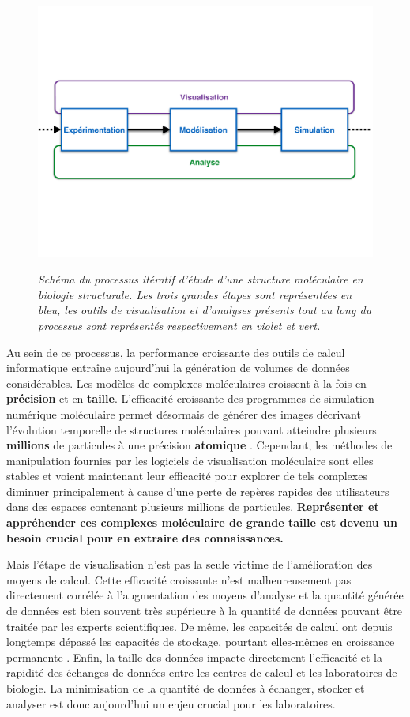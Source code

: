 \begin{figure}[h]
  \centering
  {\includegraphics[width=.75\linewidth]{./figures/ch1/process_bio_struct}}
    \caption{{\it Schéma du processus itératif d'étude d'une structure moléculaire en biologie structurale. Les trois grandes étapes sont représentées en bleu, les outils de visualisation et d'analyses présents tout au long du processus sont représentés respectivement en violet et vert.}}
  \label{Fig:process_bio_struct}
  \hspace{0.2cm}
\end{figure}

Au sein de ce processus, la performance croissante des outils de calcul informatique entraîne aujourd'hui la génération de volumes de données considérables. Les modèles de complexes moléculaires croissent à la fois en \textbf{précision} et en \textbf{taille}. L'efficacité croissante des programmes de simulation numérique moléculaire permet désormais de générer des images décrivant l'évolution temporelle de structures moléculaires pouvant atteindre plusieurs \textbf{millions} de particules à une précision \textbf{atomique} \cite{sanbonmatsu2013molecular}. Cependant, les méthodes de manipulation fournies par les logiciels de visualisation moléculaire sont elles stables et voient maintenant leur efficacité pour explorer de tels complexes diminuer principalement à cause d'une perte de repères rapides des utilisateurs dans des espaces contenant plusieurs millions de particules.
\textbf{Représenter et appréhender ces complexes moléculaire de grande taille est devenu un besoin crucial pour en extraire des connaissances.} 

Mais l'étape de visualisation n'est pas la seule victime de l'amélioration des moyens de calcul. Cette efficacité croissante n'est malheureusement pas directement corrélée à l'augmentation des moyens d'analyse et la quantité générée de données est bien souvent très supérieure à la quantité de données pouvant être traitée par les experts scientifiques. De même, les capacités de calcul ont depuis longtemps dépassé les capacités de stockage, pourtant elles-mêmes en croissance permanente \cite{zimmerman2014data}. Enfin, la taille des données impacte directement l'efficacité et la rapidité des échanges de données entre les centres de calcul et les laboratoires de biologie. La minimisation de la quantité de données à échanger, stocker et analyser est donc aujourd'hui un enjeu crucial pour les laboratoires.

